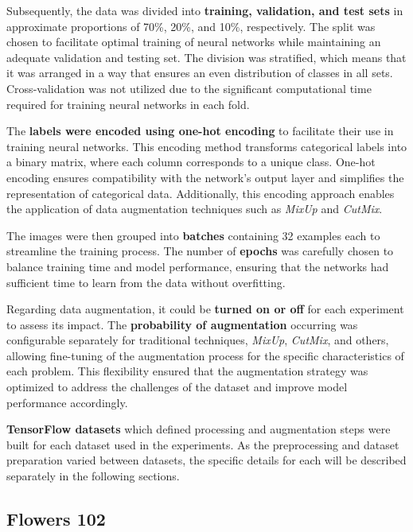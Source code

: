 Subsequently, the data was divided into \textbf{training, validation, and test sets} in approximate proportions of 70\%, 20\%, and 10\%, respectively. The split was chosen to facilitate optimal training of neural networks while maintaining an adequate validation and testing set. The division was stratified, which means that it was arranged in a way that ensures an even distribution of classes in all sets. Cross-validation was not utilized due to the significant computational time required for training neural networks in each fold.


The \textbf{labels were encoded using one-hot encoding} to facilitate their use in training neural networks. This encoding method transforms categorical labels into a binary matrix, where each column corresponds to a unique class. One-hot encoding ensures compatibility with the network's output layer and simplifies the representation of categorical data. Additionally, this encoding approach enables the application of data augmentation techniques such as \textit{MixUp} and \textit{CutMix}.

The images were then grouped into \textbf{batches} containing 32 examples each to streamline the training process. The number of \textbf{epochs} was carefully chosen to balance training time and model performance, ensuring that the networks had sufficient time to learn from the data without overfitting.

Regarding data augmentation, it could be \textbf{turned on or off} for each experiment to assess its impact. The \textbf{probability of augmentation} occurring was configurable separately for traditional techniques, \textit{MixUp}, \textit{CutMix}, and others, allowing fine-tuning of the augmentation process for the specific characteristics of each problem. This flexibility ensured that the augmentation strategy was optimized to address the challenges of the dataset and improve model performance accordingly.

\textbf{TensorFlow datasets} which defined processing and augmentation steps were built for each dataset used in the experiments. As the preprocessing and dataset preparation varied between datasets, the specific details for each will be described separately in the following sections.

\subsection{Flowers 102}
\label{ssec:Flowers102Processing}


